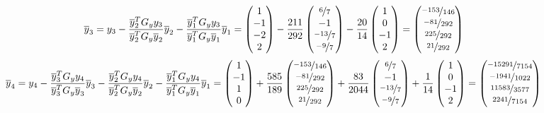 \documentclass{article}
\begin{document}
$$
    \overline{y}_3 = y_3 - \frac{\overline{y}_2^TG_yy_3}{\overline{y}_2^TG_y\overline{y}_2}\overline{y}_2 - \frac{\overline{y}_1^TG_yy_3}{\overline{y}_1^TG_y\overline{y}_1}\overline{y}_1 = \begin{pmatrix}
        1 \\ -1 \\ -2 \\ 2
    \end{pmatrix} - \frac{211}{292}\begin{pmatrix}
        \nicefrac{6}{7} \\ -1 \\ \nicefrac{-13}{7} \\ \nicefrac{-9}{7}
    \end{pmatrix} - \frac{20}{14}\begin{pmatrix}
        1 \\ 0 \\ -1 \\ 2
    \end{pmatrix} = \begin{pmatrix}
        \nicefrac{-153}{146} \\ \nicefrac{-81}{292} \\ \nicefrac{225}{292} \\ \nicefrac{21}{292}
    \end{pmatrix}
$$
$$
    \overline{y}_4 = y_4 - \frac{\overline{y}_3^TG_yy_4}{\overline{y}_3^TG_y\overline{y}_3}\overline{y}_3 - \frac{\overline{y}_2^TG_yy_4}{\overline{y}_2^TG_y\overline{y}_2}\overline{y}_2 - \frac{\overline{y}_1^TG_yy_4}{\overline{y}_1^TG_y\overline{y}_1}\overline{y}_1 = \begin{pmatrix}
        1 \\ -1 \\ 1 \\ 0
    \end{pmatrix} + \frac{585}{189}\begin{pmatrix}
        \nicefrac{-153}{146} \\ \nicefrac{-81}{292} \\ \nicefrac{225}{292} \\ \nicefrac{21}{292}
    \end{pmatrix} + \frac{83}{2044}\begin{pmatrix}
        \nicefrac{6}{7} \\ -1 \\ \nicefrac{-13}{7} \\ \nicefrac{-9}{7}
    \end{pmatrix} + \frac{1}{14}\begin{pmatrix}
        1 \\ 0 \\ -1 \\ 2
    \end{pmatrix} = \begin{pmatrix}
        \nicefrac{-15291}{7154} \\ \nicefrac{-1941}{1022}  \\ \nicefrac{11583}{3577}  \\ \nicefrac{2241}{7154}
    \end{pmatrix}
$$
\end{document}
